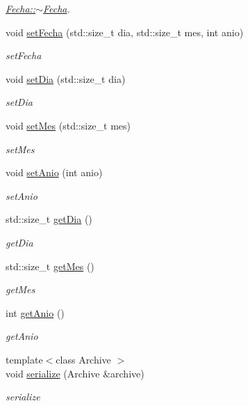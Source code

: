 \begin{DoxyCompactItemize}
\begin{DoxyCompactList}\small\item\em \hyperlink{classFecha_ae34f2ebe1ac7f3a78eefb68e8d1c8b86}{Fecha\+::$\sim$\+Fecha}. \end{DoxyCompactList}\item 
void \hyperlink{classFecha_a3040cb959b0b779c262805460d9786bb}{set\+Fecha} (std\+::size\+\_\+t dia, std\+::size\+\_\+t mes, int anio)
\begin{DoxyCompactList}\small\item\em set\+Fecha \end{DoxyCompactList}\item 
void \hyperlink{classFecha_a19af0818e81aa8d74b60fdfca7aabb04}{set\+Dia} (std\+::size\+\_\+t dia)
\begin{DoxyCompactList}\small\item\em set\+Dia \end{DoxyCompactList}\item 
void \hyperlink{classFecha_a0167b058fedd612cd2c29c3d932d0741}{set\+Mes} (std\+::size\+\_\+t mes)
\begin{DoxyCompactList}\small\item\em set\+Mes \end{DoxyCompactList}\item 
void \hyperlink{classFecha_a3cfbea8834e7a23023f11c3d069838f0}{set\+Anio} (int anio)
\begin{DoxyCompactList}\small\item\em set\+Anio \end{DoxyCompactList}\item 
std\+::size\+\_\+t \hyperlink{classFecha_a1a2191fb9b522845f249f5f1af233f58}{get\+Dia} ()
\begin{DoxyCompactList}\small\item\em get\+Dia \end{DoxyCompactList}\item 
std\+::size\+\_\+t \hyperlink{classFecha_adab1b3eed2b3e81ccf7bc78c456635ce}{get\+Mes} ()
\begin{DoxyCompactList}\small\item\em get\+Mes \end{DoxyCompactList}\item 
int \hyperlink{classFecha_a89ebafe74bc6e5f53ad688dce1d3fc26}{get\+Anio} ()
\begin{DoxyCompactList}\small\item\em get\+Anio \end{DoxyCompactList}\item 
{\footnotesize template$<$class Archive $>$ }\\void \hyperlink{classFecha_a8e2b7a6977d7d6354647af025808f750}{serialize} (Archive \&archive)
\begin{DoxyCompactList}\small\item\em serialize \end{DoxyCompactList}\end{DoxyCompactItemize}


